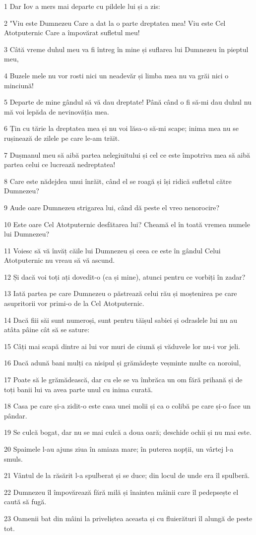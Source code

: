 \par 1 Dar Iov a mers mai departe cu pildele lui și a zis:
\par 2 "Viu este Dumnezeu Care a dat la o parte dreptatea mea! Viu este Cel Atotputernic Care a împovărat sufletul meu!
\par 3 Câtă vreme duhul meu va fi întreg în mine și suflarea lui Dumnezeu în pieptul meu,
\par 4 Buzele mele nu vor rosti nici un neadevăr și limba mea nu va grăi nici o minciună!
\par 5 Departe de mine gândul să vă dau dreptate! Până când o fi să-mi dau duhul nu mă voi lepăda de nevinovăția mea.
\par 6 Țin cu tărie la dreptatea mea și nu voi lăsa-o să-mi scape; inima mea nu se rușinează de zilele pe care le-am trăit.
\par 7 Dușmanul meu să aibă partea nelegiuitului și cel ce este împotriva mea să aibă partea celui ce lucrează nedreptatea!
\par 8 Care este nădejdea unui înrăit, când el se roagă și își ridică sufletul către Dumnezeu?
\par 9 Aude oare Dumnezeu strigarea lui, când dă peste el vreo nenorocire?
\par 10 Este oare Cel Atotputernic desfătarea lui? Cheamă el în toată vremea numele lui Dumnezeu?
\par 11 Voiesc să vă învăț căile lui Dumnezeu și ceea ce este în gândul Celui Atotputernic nu vreau să vă ascund.
\par 12 Și dacă voi toți ați dovedit-o (ca și mine), atunci pentru ce vorbiți în zadar?
\par 13 Iată partea pe care Dumnezeu o păstrează celui rău și moștenirea pe care asupritorii vor primi-o de la Cel Atotputernic.
\par 14 Dacă fiii săi sunt numeroși, sunt pentru tăișul sabiei și odraslele lui nu au atâta pâine cât să se sature:
\par 15 Câți mai scapă dintre ai lui vor muri de ciumă și văduvele lor nu-i vor jeli.
\par 16 Dacă adună bani mulți ca nisipul și grămădește veșminte multe ca noroiul,
\par 17 Poate să le grămădească, dar cu ele se va îmbrăca un om fără prihană și de toți banii lui va avea parte unul cu inima curată.
\par 18 Casa pe care și-a zidit-o este casa unei molii și ca o colibă pe care și-o face un pândar.
\par 19 Se culcă bogat, dar nu se mai culcă a doua oară; deschide ochii și nu mai este.
\par 20 Spaimele l-au ajuns ziua în amiaza mare; în puterea nopții, un vârtej l-a smuls.
\par 21 Vântul de la răsărit l-a spulberat și se duce; din locul de unde era îl spulberă.
\par 22 Dumnezeu îl împovărează fără milă și înaintea mâinii care îl pedepsește el caută să fugă.
\par 23 Oamenii bat din mâini la priveliștea aceasta și cu fluierături îl alungă de peste tot.

